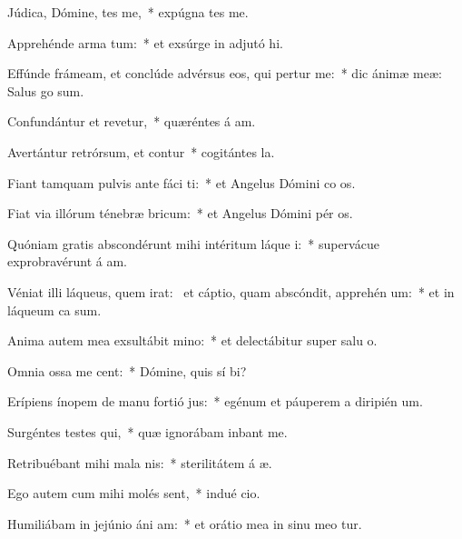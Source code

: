 \item Júdica, Dómine, tes me,~* expúgna tes me.
\item Apprehénde arma  tum:~* et exsúrge in adjutó hi.
\item Effúnde frámeam, et conclúde advérsus eos, qui pertur me:~* dic ánimæ meæ: Salus  go sum.
\item Confundántur et revetur,~* quæréntes á am.
\item Avertántur retrórsum, et contur~* cogitántes  la.
\item Fiant tamquam pulvis ante fáci ti:~* et Angelus Dómini co os.
\item Fiat via illórum ténebræ  bricum:~* et Angelus Dómini pér os.
\item Quóniam gratis abscondérunt mihi intéritum láque i:~* supervácue exprobravérunt á am.
\item Véniat illi láqueus, quem irat:~\pscross{} et cáptio, quam abscóndit, apprehén um:~* et in láqueum ca  sum.
\item Anima autem mea exsultábit  mino:~* et delectábitur super salu o.
\item Omnia ossa me cent:~* Dómine, quis sí bi?
\item Erípiens ínopem de manu fortió jus:~* egénum et páuperem a diripién um.
\item Surgéntes testes qui,~* quæ ignorábam inbant me.
\item Retribuébant mihi mala  nis:~* sterilitátem á æ.
\item Ego autem cum mihi molés sent,~* indué cio.
\item Humiliábam in jejúnio áni am:~* et orátio mea in sinu meo tur.
